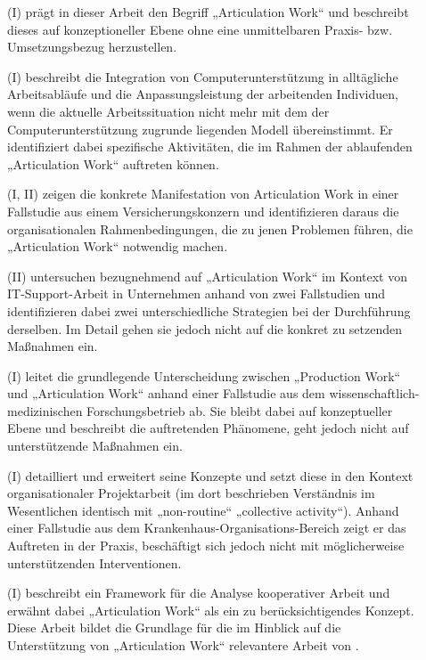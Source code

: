 \begin{description}
	\item[\citet{Strauss85}] (I) prägt in dieser Arbeit den Begriff „Articulation Work“ und beschreibt dieses auf konzeptioneller Ebene ohne eine unmittelbaren Praxis- bzw. Umsetzungsbezug herzustellen.
	\item[\citet{Gasser86}] (I) beschreibt die Integration von Computerunterstützung in alltägliche Arbeitsabläufe und die Anpassungsleistung der arbeitenden Individuen, wenn die aktuelle Arbeitssituation nicht mehr mit dem der Computerunterstützung zugrunde liegenden Modell übereinstimmt. Er identifiziert dabei spezifische Aktivitäten, die im Rahmen der ablaufenden „Articulation Work“ auftreten können.
	\item[\citet{Gerson86}] (I, II) zeigen die konkrete Manifestation von Articulation Work in einer Fallstudie aus einem Versicherungskonzern und identifizieren daraus die organisationalen Rahmenbedingungen, die zu jenen Problemen führen, die „Articulation Work“ notwendig machen.
	\item[\citet{Bendifallah87}] (II) untersuchen bezugnehmend auf \citet{Gasser86} „Articulation Work“ im Kontext von IT-Support-Arbeit in Unternehmen anhand von zwei Fallstudien und identifizieren dabei zwei unterschiedliche Strategien bei der Durchführung derselben. Im Detail gehen sie jedoch nicht auf die konkret zu setzenden Maßnahmen ein.
	\item[\citet{Fujimura87}] (I) leitet die grundlegende Unterscheidung zwischen „Production Work“ und „Articulation Work“ anhand einer Fallstudie aus dem wissenschaftlich-medizinischen Forschungsbetrieb ab. Sie bleibt dabei auf konzeptueller Ebene und beschreibt die auftretenden Phänomene, geht jedoch nicht auf unterstützende Maßnahmen ein.
	\item[\citet{Strauss88}] (I) detailliert und erweitert seine Konzepte und setzt diese in den Kontext organisationaler Projektarbeit (im dort beschrieben Verständnis im Wesentlichen identisch mit „non-routine“ „collective activity“). Anhand einer Fallstudie aus dem Krankenhaus-Organisations-Bereich zeigt er das Auftreten in der Praxis, beschäftigt sich jedoch nicht mit möglicherweise unterstützenden Interventionen.
	\item[\citet{Schmidt90}] (I) beschreibt ein Framework für die Analyse kooperativer Arbeit und erwähnt dabei „Articulation Work“ als ein zu berücksichtigendes Konzept. Diese Arbeit bildet die Grundlage für die im Hinblick auf die Unterstützung von „Articulation Work“ relevantere Arbeit von \citet{Schmidt92}.

\end{description}
